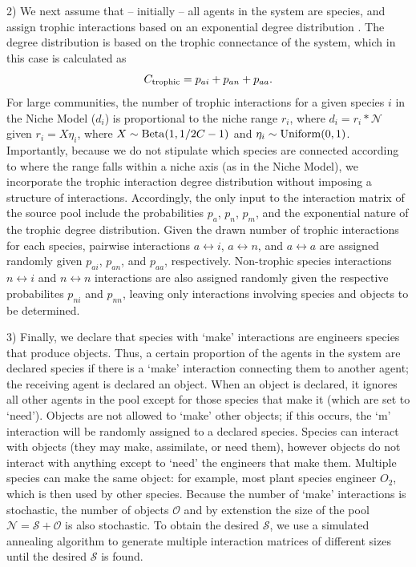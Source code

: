 \documentclass[twocolumn,preprintnumbers,amsmath,amssymb,superscriptaddress]{revtex4}
\begin{document}
2) We next assume that -- initially -- all agents in the system are species, and assign trophic interactions based on an exponential degree distribution \cite{Williams:2000wt}.
The degree distribution is based on the trophic connectance of the system, which in this case is calculated as 
\begin{equation}
  C_{\rm trophic} = p_{ai}+p_{an}+p_{aa}.
\end{equation}
For large communities, the number of trophic interactions for a given species $i$ in the Niche Model ($d_i$) is proportional to the niche range $r_i$, where $d_i = r_i*\mathcal{N}$ given $r_i = X\eta_i$, where $X \sim {\rm Beta}(1,1/2C - 1)$ and $\eta_i \sim {\rm Uniform}(0,1)$. %
Importantly, because we do not stipulate which species are connected according to where the range falls within a niche axis (as in the Niche Model), we incorporate the trophic interaction degree distribution without imposing a structure of interactions.
Accordingly, the only input to the interaction matrix of the source pool include the probabilities $p_a$, $p_n$, $p_m$, and the exponential nature of the trophic degree distribution.
Given the drawn number of trophic interactions for each species, pairwise interactions $a \leftrightarrow i$, $a \leftrightarrow n$, and $a \leftrightarrow a$ are assigned randomly given $p_{ai}$, $p_{an}$, and $p_{aa}$, respectively.
Non-trophic species interactions $n \leftrightarrow i$ and $n \leftrightarrow n$ interactions are also assigned randomly given the respective probabilites $p_{ni}$ and $p_{nn}$, leaving only interactions involving species and objects to be determined.


3) Finally, we declare that species with `make' interactions are engineers species that produce objects.
Thus, a certain proportion of the agents in the system are declared species if there is a `make' interaction connecting them to another agent; the receiving agent is declared an object.
When an object is declared, it ignores all other agents in the pool except for those species that make it (which are set to `need').
Objects are not allowed to `make' other objects; if this occurs, the `m' interaction will be randomly assigned to a declared species.
Species can interact with objects (they may make, assimilate, or need them), however objects do not interact with anything except to `need' the engineers that make them.
Multiple species can make the same object: for example, most plant species engineer $O_2$, which is then used by other species.
Because the number of `make' interactions is stochastic, the number of objects $\mathcal{O}$ and by extenstion the size of the pool $\mathcal{N} = \mathcal{S} + \mathcal{O}$ is also stochastic.
To obtain the desired $\mathcal{S}$, we use a simulated annealing algorithm to generate multiple interaction matrices of different sizes until the desired $\mathcal{S}$ is found.
\end{document}
